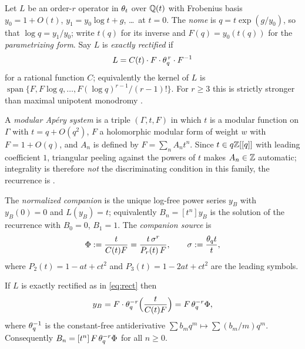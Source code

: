 \begin{definition}\label{def:nome}
Let $L$ be an order-$r$ operator in $\theta_t$ over $\mathbb{Q}(t)$ with Frobenius basis
$y_0=1+O(t)$, $y_1=y_0\log t+g$, \dots\ at $t=0$.  The \emph{nome} is
$q=t\exp(g/y_0)$, so that $\log q=y_1/y_0$; write $t(q)$ for its inverse and
$F(q)=y_0(t(q))$ for the \emph{parametrizing form}.  Say $L$ is
\emph{exactly rectified} if
\begin{equation}\label{eq:rect}
L=C(t)\cdot F\cdot\theta_q^{\,r}\cdot F^{-1}
\end{equation}
for a rational function $C$; equivalently the kernel of $L$ is
$\operatorname{span}\{F,F\log q,\dots,F(\log q)^{r-1}/(r-1)!\}$.  For $r\ge3$
this is strictly stronger than maximal unipotent monodromy
\cite[\S1]{ProjAnchors}.
\end{definition}

A \emph{modular Ap\'ery system} is a triple $(\Gamma,t,F)$ in which $t$ is a
modular function on $\Gamma$ with $t=q+O(q^2)$, $F$ a holomorphic modular form
of weight $w$ with $F=1+O(q)$, and $A_n$ is defined by $F=\sum_nA_nt^n$.  Since
$t\in q\mathbb{Z}[[q]]$ with leading coefficient $1$, triangular peeling against the
powers of $t$ makes $A_n\in\mathbb{Z}$ automatic; integrality is therefore \emph{not}
the discriminating condition in this family, the recurrence is
\cite[\S1]{ProjSporadicSearch}.

\begin{definition}\label{def:companion}
The \emph{normalized companion} is the unique log-free power series $y_B$ with
$y_B(0)=0$ and $L(y_B)=t$; equivalently $B_n=[t^n]y_B$ is the solution of the
recurrence with $B_0=0$, $B_1=1$.  The \emph{companion source} is
\begin{equation}\label{eq:sourcedef}
\Phi:=\frac{t}{C(t)F}=\frac{t\,\sigma^{r}}{P_r(t)\,F},
\qquad \sigma:=\frac{\theta_q t}{t},
\end{equation}
where $P_2(t)=1-at+ct^2$ and $P_3(t)=1-2at+ct^2$ are the leading symbols.
\end{definition}

\begin{theorem}
\label{thm:inversion}
\Proved{} If $L$ is exactly rectified as in \eqref{eq:rect} then
\[
y_B=F\cdot\theta_q^{-r}\Bigl(\frac{t}{C(t)F}\Bigr)=F\,\theta_q^{-r}\Phi ,
\]
where $\theta_q^{-1}$ is the constant-free antiderivative
$\sum b_mq^m\mapsto\sum(b_m/m)q^m$.  Consequently
$B_n=[t^n]\,F\,\theta_q^{-r}\Phi$ for all $n\ge0$.
\end{theorem}

